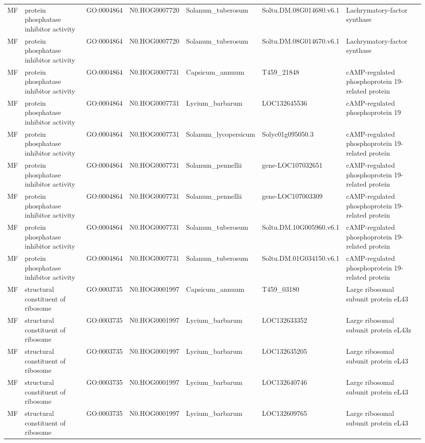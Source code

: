 \begin{table}
\begin{tabular}[t]{lllllll}
MF & protein phosphatase inhibitor activity & GO:0004864 & N0.HOG0007720 & Solanum\_tuberosum & Soltu.DM.08G014680.v6.1 & Lachrymatory-factor synthase\\
MF & protein phosphatase inhibitor activity & GO:0004864 & N0.HOG0007720 & Solanum\_tuberosum & Soltu.DM.08G014670.v6.1 & Lachrymatory-factor synthase\\
MF & protein phosphatase inhibitor activity & GO:0004864 & N0.HOG0007731 & Capsicum\_annuum & T459\_21848 & cAMP-regulated phosphoprotein 19-related protein\\
MF & protein phosphatase inhibitor activity & GO:0004864 & N0.HOG0007731 & Lycium\_barbarum & LOC132645536 & cAMP-regulated phosphoprotein 19\\
MF & protein phosphatase inhibitor activity & GO:0004864 & N0.HOG0007731 & Solanum\_lycopersicum & Solyc01g095050.3 & cAMP-regulated phosphoprotein 19-related protein\\
MF & protein phosphatase inhibitor activity & GO:0004864 & N0.HOG0007731 & Solanum\_pennellii & gene-LOC107032651 & cAMP-regulated phosphoprotein 19-related protein\\
MF & protein phosphatase inhibitor activity & GO:0004864 & N0.HOG0007731 & Solanum\_pennellii & gene-LOC107003309 & cAMP-regulated phosphoprotein 19-related protein\\
MF & protein phosphatase inhibitor activity & GO:0004864 & N0.HOG0007731 & Solanum\_tuberosum & Soltu.DM.10G005960.v6.1 & cAMP-regulated phosphoprotein 19-related protein\\
MF & protein phosphatase inhibitor activity & GO:0004864 & N0.HOG0007731 & Solanum\_tuberosum & Soltu.DM.01G034150.v6.1 & cAMP-regulated phosphoprotein 19-related protein\\
MF & structural constituent of ribosome & GO:0003735 & N0.HOG0001997 & Capsicum\_annuum & T459\_03180 & Large ribosomal subunit protein eL43\\
MF & structural constituent of ribosome & GO:0003735 & N0.HOG0001997 & Lycium\_barbarum & LOC132633352 & Large ribosomal subunit protein eL43z\\
MF & structural constituent of ribosome & GO:0003735 & N0.HOG0001997 & Lycium\_barbarum & LOC132635205 & Large ribosomal subunit protein eL43\\
MF & structural constituent of ribosome & GO:0003735 & N0.HOG0001997 & Lycium\_barbarum & LOC132640746 & Large ribosomal subunit protein eL43\\
MF & structural constituent of ribosome & GO:0003735 & N0.HOG0001997 & Lycium\_barbarum & LOC132609765 & Large ribosomal subunit protein eL43\\

\end{tabular}
\end{table}
